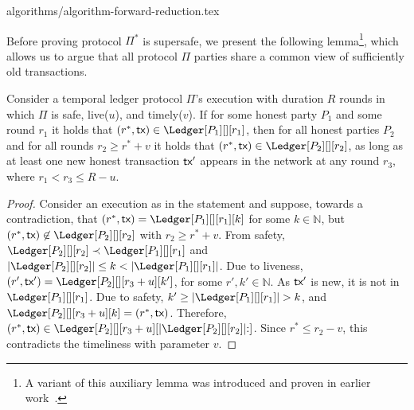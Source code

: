 {algorithms/algorithm-forward-reduction.tex}

Before proving protocol $\Pi^*$ is supersafe, we present
the following lemma\footnote{
  A variant of this auxiliary lemma was introduced and proven in earlier work~\cite{rollerblade}.
}, which allows us to argue that all
protocol $\Pi$ parties share a common view of sufficiently old transactions.



\begin{lemma}\label{lem:past-perfect}
  Consider a temporal ledger protocol $\Pi$'s
  execution with duration $R$ rounds in which $\Pi$ is
  safe, live($u$), and timely($v$).
  If for some honest party $P_1$ and some round $r_1$ it holds that
  $(r^*, \tx) \in \Ledger[P_1][][r_1]$, then
  for all honest parties $P_2$ and for all rounds $r_2 \geq r^* + v$
  it holds that $(r^*, \tx) \in \Ledger[P_2][][r_2]$,
  as long as at least one new honest transaction $\textsf{tx}'$ appears in the
  network at any round $r_3$, where $r_1 < r_3 \leq R - u$.
\end{lemma}
\begin{proof}
  Consider an execution as in the statement and suppose, towards a contradiction,
  that $(r^*, \tx) = \Ledger[P_1][][r_1][k]$ for some $k \in \mathbb{N}$,
  but $(r^*, \tx) \not\in \Ledger[P_2][][r_2]$
  with $r_2 \geq r^* + v$.
  From safety,
  $\Ledger[P_2][][r_2] \prec \Ledger[P_1][][r_1]$ and
  $|\Ledger[P_2][][r_2]| \leq k < |\Ledger[P_1][][r_1]|$.
  Due to liveness, $(r', \tx') = \Ledger[P_2][][r_3 + u][k']$,
  for some $r', k' \in \mathbb{N}$.
  As $\textsf{tx}'$ is new, it is not in $\Ledger[P_1][][r_1]$.
  Due to safety, $k' \geq |\Ledger[P_1][][r_1]| > k$, and
  $\Ledger[P_2][][r_3 + u][k] = (r^*, \tx)$.
  Therefore,
  $(r^*, \tx) \in \Ledger[P_2][][r_3 + u][|\Ledger[P_2][][r_2]|{:}]$.
  Since $r^* \leq r_2 - v$, this contradicts the timeliness with parameter $v$.\Qed
\end{proof}


